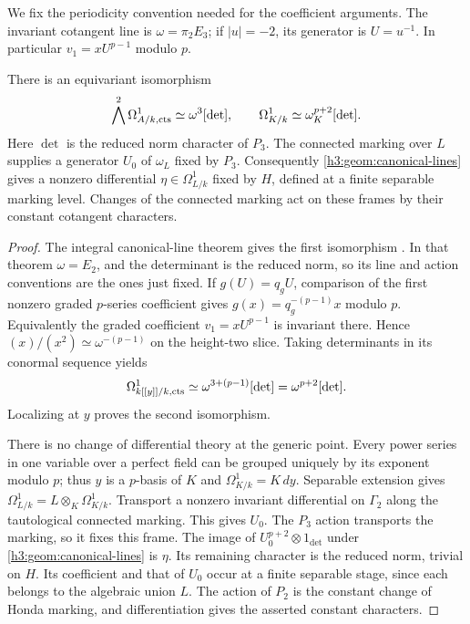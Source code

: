 We fix the periodicity convention needed for the coefficient
arguments.  The invariant cotangent line is
$\omega=\pi_2E_3$; if $|u|=-2$, its generator is $U=u^{-1}$.
In particular $v_1=xU^{p-1}$ modulo $p$.

\begin{lemma}\label{h3:lem:invariant-differential}
There is an equivariant isomorphism
\begin{equation}\label{h3:geom:canonical-lines}
 \bigwedge^2\Omega^1_{A/k,\mathrm{cts}}\simeq\omega^3[\det],
 \qquad
 \Omega^1_{K/k}\simeq\omega_K^{p+2}[\det].
\end{equation}
Here $\det$ is the reduced norm character of $P_3$.
The connected marking over $L$ supplies a generator $U_0$ of
$\omega_L$ fixed by $P_3$.  Consequently
\eqref{h3:geom:canonical-lines} gives a nonzero differential
$\eta\in\Omega^1_{L/k}$ fixed by $H$, defined at a finite
separable marking level.  Changes of the connected marking
act on these frames by their constant cotangent characters.
\end{lemma}

\begin{proof}
The integral canonical-line theorem gives the first isomorphism
\cite[Theorem 20]{GHdual}.  In that theorem $\omega=E_2$, and
the determinant is the reduced norm, so its line and action
conventions are the ones just fixed.  If $g(U)=q_gU$, comparison
of the first nonzero graded $p$-series coefficient gives
$g(x)=q_g^{-(p-1)}x$ modulo $p$.  Equivalently the graded
coefficient $v_1=xU^{p-1}$ is invariant there.  Hence
$(x)/(x^2)\simeq\omega^{-(p-1)}$ on the height-two slice.
Taking determinants in its conormal sequence yields
\[
 \Omega^1_{k[[y]]/k,\mathrm{cts}}
 \simeq\omega^{3+(p-1)}[\det]
 =\omega^{p+2}[\det].
\]
Localizing at $y$ proves the second isomorphism.

There is no change of differential theory at the generic point.
Every power series in one variable over a perfect field can
be grouped uniquely by its exponent modulo $p$; thus $y$ is
a $p$-basis of $K$ and $\Omega^1_{K/k}=K\,dy$.
Separable extension gives
$\Omega^1_{L/k}=L\otimes_K\Omega^1_{K/k}$.
Transport a nonzero invariant differential on $\Gamma_2$
along the tautological connected marking.  This gives $U_0$.
The $P_3$ action transports the marking, so it fixes this
frame.  The image of $U_0^{p+2}\otimes1_{\det}$ under
\eqref{h3:geom:canonical-lines} is $\eta$.  Its remaining
character is the reduced norm, trivial on $H$.  Its
coefficient and that of $U_0$ occur at a finite separable
stage, since each belongs to the algebraic union $L$.
The action of $P_2$ is the constant change of Honda marking,
and differentiation gives the asserted constant characters.
\end{proof}


